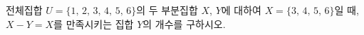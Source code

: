 전체집합 $U=\{1,\,2,\,3,\,4,\,5,\,6\}$의 두 부분집합 $X$, $Y$에 대하여 $X=\{3,\,4,\,5,\,6\}$일 때, $X-Y=X$를 만족시키는 집합 $Y$의 개수를 구하시오.
